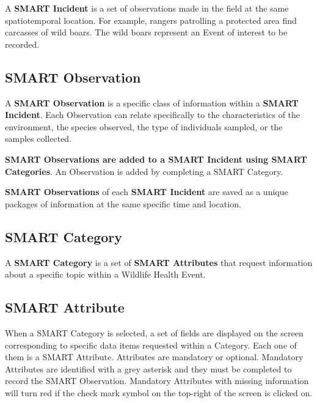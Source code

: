 \documentclass[
  letterpaper,
  DIV=11,
  numbers=noendperiod]{scrreprt}
\begin{document}
A \textbf{SMART Incident} is a set of observations made in the field at
the same spatiotemporal location. For example, rangers patrolling a
protected area find carcasses of wild boars. The wild boars represent an
Event of interest to be recorded.

\hypertarget{smart-observation}{%
\subsection*{SMART Observation}\label{smart-observation}}

A \textbf{SMART Observation} is a specific class of information within a
\textbf{SMART Incident}. Each Observation can relate specifically to the
characteristics of the environment, the species observed, the type of
individuals sampled, or the samples collected.

\textbf{SMART Observations are added to a SMART Incident using SMART
Categories}. An Observation is added by completing a SMART Category.

\textbf{SMART Observations} of each \textbf{SMART Incident} are saved as
a unique packages of information at the same specific time and location.

\hypertarget{smart-category}{%
\subsection*{SMART Category}\label{smart-category}}

A \textbf{SMART Category} is a set of \textbf{SMART Attributes} that
request information about a specific topic within a Wildlife Health
Event.

\hypertarget{smart-attribute}{%
\subsection*{SMART Attribute}\label{smart-attribute}}

When a SMART Category is selected, a set of fields are displayed on the
screen corresponding to specific data items requested within a Category.
Each one of them is a SMART Attribute. Attributes are mandatory or
optional. Mandatory Attributes are identified with a grey asterisk and
they must be completed to record the SMART Observation. Mandatory
Attributes with missing information will turn red if the check mark
symbol on the top-right of the screen is clicked on.
\end{document}
